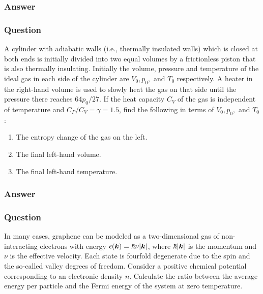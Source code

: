 \subsubsection{Answer}



\subsubsection{Question}

A cylinder with adiabatic walls (i.e., thermally insulated walls) which is closed at both ends is initially divided into two equal volumes by a frictionless piston that is also thermally insulating. Initially the volume, pressure and temperature of the ideal gas in each side of the cylinder are $V_0, p_0,$ and $T_0$ respectively. A heater in the right-hand volume is used to slowly heat the gas on that side until the pressure there reaches $64p_0/27$. If the heat capacity $C_V$ of the gas is independent of temperature and $C_P/C_V = \gamma = 1.5$, find the following in terms of $V_0, p_0,$ and $T_0$:
\begin{enumerate}
	\item The entropy change of the gas on the left.
	\item The final left-hand volume.
	\item The final left-hand temperature.
\end{enumerate}
\subsubsection{Answer}



\subsubsection{Question}
In many cases, graphene can be modeled as a two-dimensional gas of non-interacting electrons with energy $\epsilon(\boldsymbol{k}) = \hbar\nu\abs{\boldsymbol{k}}$, where $\hbar\abs{\boldsymbol{k}}$ is the momentum and $\nu$ is the effective velocity. Each state is fourfold degenerate due to the spin and the so-called valley degrees of freedom. Consider a positive chemical potential corresponding to an electronic density $n$. Calculate the ratio between the average energy per particle and the Fermi energy of the system at zero temperature.
